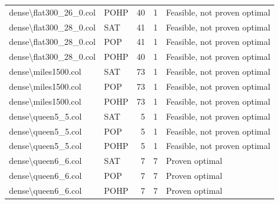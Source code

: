\begin{longtable}{llrrl}
dense\textbackslash{}flat300\_26\_0.col & POHP & 40 & 1 & Feasible, not proven optimal \\
dense\textbackslash{}flat300\_28\_0.col & SAT & 41 & 1 & Feasible, not proven optimal \\
dense\textbackslash{}flat300\_28\_0.col & POP & 41 & 1 & Feasible, not proven optimal \\
dense\textbackslash{}flat300\_28\_0.col & POHP & 40 & 1 & Feasible, not proven optimal \\
dense\textbackslash{}miles1500.col & SAT & 73 & 1 & Feasible, not proven optimal \\
dense\textbackslash{}miles1500.col & POP & 73 & 1 & Feasible, not proven optimal \\
dense\textbackslash{}miles1500.col & POHP & 73 & 1 & Feasible, not proven optimal \\
dense\textbackslash{}queen5\_5.col & SAT & 5 & 1 & Feasible, not proven optimal \\
dense\textbackslash{}queen5\_5.col & POP & 5 & 1 & Feasible, not proven optimal \\
dense\textbackslash{}queen5\_5.col & POHP & 5 & 1 & Feasible, not proven optimal \\
dense\textbackslash{}queen6\_6.col & SAT & 7 & 7 & Proven optimal \\
dense\textbackslash{}queen6\_6.col & POP & 7 & 7 & Proven optimal \\
dense\textbackslash{}queen6\_6.col & POHP & 7 & 7 & Proven optimal \\
\end{longtable}
